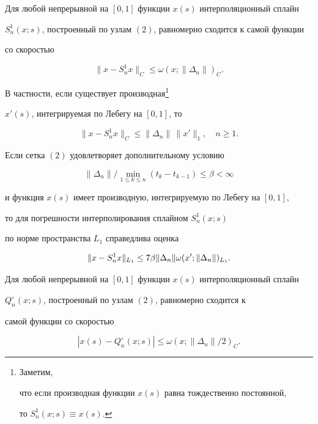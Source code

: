 \begin{lem}


Для любой непрерывной на $[0,1]$ функции $x(s)$ интерполяционный сплайн


$S_n^1(x;s)$, построенный по узлам $(2)$, равномерно сходится к самой функции


со скоростью


$$


\|x-S_n^1x\|_C \leq \omega(x;\|\Delta_n\|)_C .


$$


В частности, если существует производная\footnote{Заметим, 


что если производная функции $x(s)$ равна тождественно постоянной,


то $S_n^1(x;s)\equiv x(s)$.}


$x'(s)$, интегрируемая по Лебегу на $[0,1]$, то


$$


\|x-S_n^1x\|_C \leq \|\Delta_n\|\, \|x'\|_1,\quad n\geq 1 .


$$





Если сетка $(2)$ удовлетворяет дополнительному условию


\begin{equation}


\|\Delta_n\|\big/ \min_{1\leq k\leq n}(t_k-t_{k-1})\leq \beta <\infty


\end{equation}


и функция $x(s)$ имеет производную, интегрируемую по Лебегу на $[0,1]$,


то для погрешности интерполирования сплайном $S_n^1(x;s)$


по норме пространства $L_1$ справедлива оценка


$$


\|x-S_n^1x\|_\aL \leq 7\beta \|\Delta_n\|


\omega(x';\|\Delta_n\|)_\aL .


$$


\end{lem}








\begin{lem}


Для любой непрерывной на $[0,1]$ функции $x(s)$ интерполяционный сплайн


$Q_n^\circ (x;s)$, построенный по узлам $(2)$, равномерно сходится к


самой функции со скоростью


$$


|x(s)-Q_n^\circ (x;s)| \leq \omega(x;\|\Delta_n\|/2)_C .


$$


\end{lem}








